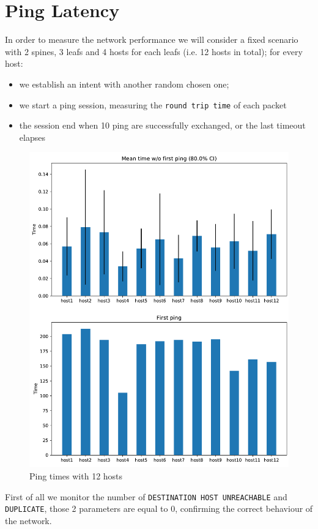 \section{Ping Latency}
In order to measure the network performance we will consider a fixed scenario with 2 spines, 3 leafs and 4 hosts for each leafs (i.e. 12 hosts in total);
for every host:
\begin{itemize}
    \item  we establish an intent with another random chosen one;
    \item  we start a ping session, measuring the \texttt{round trip time} of each packet
    \item  the session end when 10 ping are successfully exchanged, or the last timeout elapses
\end{itemize} 
\begin{figure}[h]
    \centering
    \includegraphics[width=.92\textwidth]{img/mean_ping_time.pdf}
    \caption{Ping times with 12 hosts}
    \label{img:perf1}
\end{figure}
First of all we monitor the number of \texttt{DESTINATION HOST UNREACHABLE} and \texttt{DUPLICATE}, those 2 parameters are equal to 0, confirming the correct
behaviour of the network.
